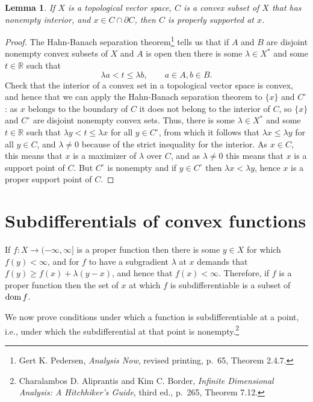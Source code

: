 \documentclass{article}
\newcommand{\dom}{\ensuremath\mathrm{dom}\,}
\newtheorem{lemma}[theorem]{Lemma}
\theoremstyle{definition}
\begin{document}
\begin{lemma}
If $X$ is a topological vector space, $C$ is a convex subset of $X$ that has nonempty interior, and $x \in C \cap \partial C$,
then $C$ is properly supported at $x$.
\label{propersupport}
\end{lemma}
\begin{proof}
The Hahn-Banach separation theorem\footnote{Gert K. Pedersen, {\em Analysis Now}, revised printing, p.~65, Theorem 2.4.7.} tells us that if
$A$ and $B$ are disjoint nonempty convex subsets of $X$ and $A$ is open then there is some $\lambda \in X^*$ and some $t \in \mathbb{R}$ such that
\[
\lambda a <t \leq \lambda b, \qquad a\in A, b\in B.
\]
Check that the interior of a convex set in a topological vector space is convex, and hence that we can apply the Hahn-Banach separation theorem
to $\{x\}$ and $C^\circ$: as $x$ belongs to the boundary of $C$ it does not belong to the interior of $C$, so
$\{x\}$ and $C^\circ$   are disjoint nonempty convex sets. Thus, there is some $\lambda \in X^*$ and some $t \in \mathbb{R}$ such that
$\lambda y < t \leq \lambda x$ for all $y \in C^\circ$, from which it follows that $\lambda x \leq \lambda y$ for all $y \in C$, and  $\lambda \neq 0$ because
of the strict inequality for the interior. As $x \in C$, this means that $x$ is a maximizer of $\lambda$ over $C$, and as $\lambda \neq 0$ this means that $x$ is 
a support point of $C$. But $C^\circ$ is nonempty and if $y \in C^\circ$ then $\lambda x < \lambda y$, hence $x$ is a proper support point of $C$.
\end{proof}






\section{Subdifferentials of convex functions}
If $f:X \to (-\infty,\infty]$ is a proper  function then there is some $y \in X$ for which $f(y)<\infty$, and for $f$ to have a subgradient 
$\lambda$ at $x$ demands that $f(y) \geq f(x)+\lambda(y-x)$, and hence that $f(x)<\infty$. Therefore, if $f$ is a proper  function
then the set of $x$ at which $f$ is subdifferentiable is a subset of  $\dom f$.

We now prove conditions under which a function is subdifferentiable at a point, i.e., under which the subdifferential at that point is nonempty.\footnote{Charalambos D. Aliprantis and Kim C. Border, {\em Infinite Dimensional Analysis: A Hitchhiker's Guide}, third ed., p.~265, Theorem 7.12.}
\end{document}
